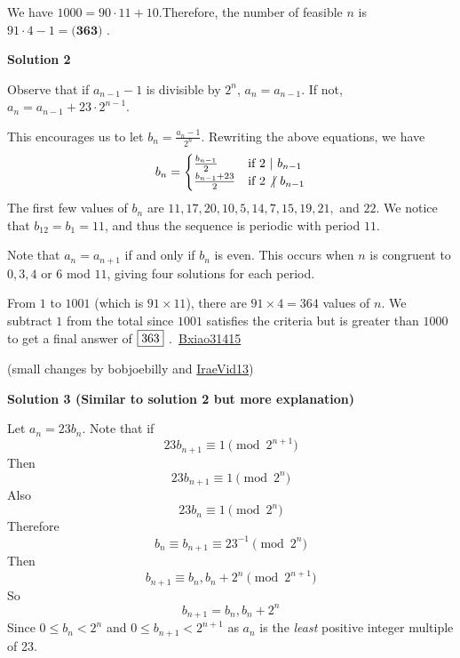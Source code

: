 \begin{enumerate}
 We have $1000 = 90 \cdot 11 + 10$.Therefore, the number of feasible $n$ is $91 \cdot 4 - 1 = \boxed{\textbf{(363) }}$.

 



\textbf{Solution 2}

Observe that if $a_{n-1} - 1$ is divisible by $2^n$, $a_n = a_{n-1}$. If not, $a_n = a_{n-1} + 23 \cdot 2^{n-1}$.

 This encourages us to let $b_n = \frac{a_n - 1}{2^n}$. Rewriting the above equations, we have
 \[b_n = \begin{cases} \frac{b_{n-1}}{2} & \text{if } 2 \text{ } \vert \text{ } b_{n-1} \\ \frac{b_{n-1}+23}{2} &\text{if } 2 \not\vert \text{ } b_{n-1} \end{cases}\]The first few values of $b_n$ are $11, 17, 20, 10, 5, 14, 7, 15, 19, 21,$ and $22$. We notice that $b_{12} = b_1 = 11$, and thus the sequence is periodic with period $11$.

 Note that $a_n = a_{n+1}$ if and only if $b_n$ is even. This occurs when $n$ is congruent to $0, 3, 4$ or $6$ mod $11$, giving four solutions for each period.

 From $1$ to $1001$ (which is $91 \times 11$), there are $91 \times 4 = 364$ values of $n$. We subtract $1$ from the total since $1001$ satisfies the criteria but is greater than $1000$ to get a final answer of $\fbox{363}$ .~\href{https://artofproblemsolving.com/wiki/index.php?title=User:Bxiao31415}{Bxiao31415}

 (small changes by bobjoebilly and \href{https://artofproblemsolving.com/wiki/index.php?title=User:Iraevid13}{IraeVid13})

 



\textbf{Solution 3 (Similar to solution 2 but more explanation)}

Let $a_n = 23b_n$. Note that if
 \[23 b_{n+1} \equiv 1 \pmod{2^{n+1}}\]Then
 \[23 b_{n+1} \equiv 1 \pmod{2^{n}}\]Also
 \[23 b_n \equiv 1 \pmod{2^n}\]Therefore
 \[b_n \equiv b_{n+1} \equiv 23^{-1} \pmod{2^n}\]Then
 \[b_{n+1} \equiv b_n, b_n + 2^n \pmod{2^{n+1}}\]So
 \[b_{n+1} = b_n, b_n + 2^n\]Since $0 \le b_n < 2^n$ and $0 \le b_{n+1} < 2^{n+1}$ as $a_n$ is the \textit{least} positive integer multiple of 23.


\end{enumerate}
